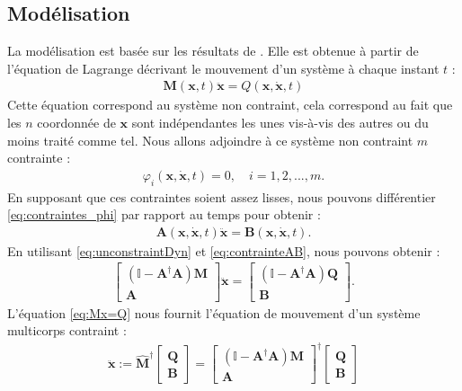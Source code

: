 \subsection{Modélisation}
La modélisation est basée sur les résultats de \cite[Équation (2.15)]{udwadia-phohomsiri}. 
Elle est obtenue à partir de l'équation de Lagrange décrivant le mouvement d'un système à chaque instant $t$ :
\begin{align}
    \label{eq:unconstraintDyn}
    \boldsymbol{M}(\boldsymbol{x},t) \ddot{\boldsymbol{x}} = Q(\boldsymbol{x}, \dot{\boldsymbol{x}}, t)
\end{align}
Cette équation correspond au système non contraint, cela correspond au fait que les $n$ coordonnée de $\boldsymbol{x}$ sont indépendantes les unes vis-à-vis des autres ou du moins traité comme tel. Nous allons adjoindre à ce système non contraint $m$ contrainte :
\begin{align}
    \label{eq:contraintes_phi}
    \varphi_{i}(\boldsymbol{x},\dot{\boldsymbol{x}},t) = 0, \quad i=1,2,...,m.
\end{align}
En supposant que ces contraintes soient assez lisses, nous pouvons différentier \eqref{eq:contraintes_phi} par rapport au temps pour obtenir : 
\begin{align}
    \label{eq:contrainteAB}
    \boldsymbol{A}(\boldsymbol{x},\dot{\boldsymbol{x}}, t) \ddot{\boldsymbol{x}} = \boldsymbol{B}(\boldsymbol{x},\dot{\boldsymbol{x}},t).
\end{align}
En utilisant \eqref{eq:unconstraintDyn} et \eqref{eq:contrainteAB}, nous pouvons obtenir :
\begin{align}
    \label{eq:Mx=Q}
    \begin{bmatrix} (\mathbb{I} - \boldsymbol{A}^{\dag}\boldsymbol{A})\boldsymbol{M} \\ \boldsymbol{A} \end{bmatrix}  \ddot{\boldsymbol{x}}  =  \begin{bmatrix} (\mathbb{I} - \boldsymbol{A}^{\dag}\boldsymbol{A}) \boldsymbol{Q} \\ \boldsymbol{B} \end{bmatrix}.
\end{align}
 L'équation \eqref{eq:Mx=Q} nous fournit l'équation de mouvement d'un système multicorps contraint : 
\begin{align}
\label{eq:udwadia}
    \ddot{\boldsymbol{x}} := \hat{\boldsymbol{M}}^{\dag} \begin{bmatrix} \boldsymbol{Q} \\ \boldsymbol{B} \end{bmatrix}  = \begin{bmatrix} (\mathbb{I} - \boldsymbol{A}^{\dag}\boldsymbol{A})\boldsymbol{M} \\ \boldsymbol{A} \end{bmatrix}^{\dag} \begin{bmatrix} \boldsymbol{Q} \\ \boldsymbol{B} \end{bmatrix}
\end{align}
